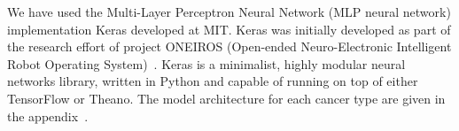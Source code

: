 \documentclass[10pt,letterpaper]{article}
\begin{document}
We have used the Multi-Layer Perceptron Neural Network (MLP neural network) implementation Keras developed at MIT.
Keras was initially developed as part of the research effort of project ONEIROS (Open-ended Neuro-Electronic Intelligent Robot Operating System)~\cite{keras}.
Keras is a minimalist, highly modular neural networks library, written in Python and capable of running on top of either TensorFlow or Theano. The model architecture for each cancer type are given in the appendix~.







\end{document}
